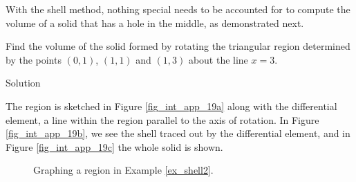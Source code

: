 With the shell method, nothing special needs to be accounted for to compute the volume of a solid that has a hole in the middle, as demonstrated next.\\

\begin{example}\label{ex_shell2}
Find the volume of the solid formed by rotating the triangular region determined by the points $(0,1)$, $(1,1)$ and $(1,3)$ about the line $x=3$.

Solution 

The region is sketched in Figure \ref{fig_int_app_19a} along with the differential element, a line within the region parallel to the axis of rotation. In  Figure \ref{fig_int_app_19b}, we see the shell traced out by the differential element, and in  Figure \ref{fig_int_app_19c} the whole solid is shown.

\begin{figure}[H]
\centering
\qquad
{}
\qquad
{}
\caption{Graphing a region in Example \ref{ex_shell2}.}
\end{figure}



\end{example}
